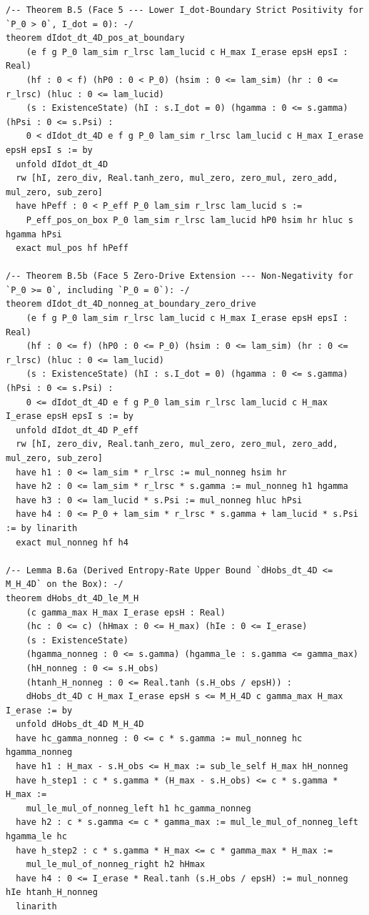 \documentclass[11pt,a4paper]{article}
\theoremstyle{definition}
\begin{document}
\begin{lstlisting}[language=Lean4]
/-- Theorem B.5 (Face 5 --- Lower I_dot-Boundary Strict Positivity for `P_0 > 0`, I_dot = 0): -/
theorem dIdot_dt_4D_pos_at_boundary
    (e f g P_0 lam_sim r_lrsc lam_lucid c H_max I_erase epsH epsI : Real)
    (hf : 0 < f) (hP0 : 0 < P_0) (hsim : 0 <= lam_sim) (hr : 0 <= r_lrsc) (hluc : 0 <= lam_lucid)
    (s : ExistenceState) (hI : s.I_dot = 0) (hgamma : 0 <= s.gamma) (hPsi : 0 <= s.Psi) :
    0 < dIdot_dt_4D e f g P_0 lam_sim r_lrsc lam_lucid c H_max I_erase epsH epsI s := by
  unfold dIdot_dt_4D
  rw [hI, zero_div, Real.tanh_zero, mul_zero, zero_mul, zero_add, mul_zero, sub_zero]
  have hPeff : 0 < P_eff P_0 lam_sim r_lrsc lam_lucid s :=
    P_eff_pos_on_box P_0 lam_sim r_lrsc lam_lucid hP0 hsim hr hluc s hgamma hPsi
  exact mul_pos hf hPeff

/-- Theorem B.5b (Face 5 Zero-Drive Extension --- Non-Negativity for `P_0 >= 0`, including `P_0 = 0`): -/
theorem dIdot_dt_4D_nonneg_at_boundary_zero_drive
    (e f g P_0 lam_sim r_lrsc lam_lucid c H_max I_erase epsH epsI : Real)
    (hf : 0 <= f) (hP0 : 0 <= P_0) (hsim : 0 <= lam_sim) (hr : 0 <= r_lrsc) (hluc : 0 <= lam_lucid)
    (s : ExistenceState) (hI : s.I_dot = 0) (hgamma : 0 <= s.gamma) (hPsi : 0 <= s.Psi) :
    0 <= dIdot_dt_4D e f g P_0 lam_sim r_lrsc lam_lucid c H_max I_erase epsH epsI s := by
  unfold dIdot_dt_4D P_eff
  rw [hI, zero_div, Real.tanh_zero, mul_zero, zero_mul, zero_add, mul_zero, sub_zero]
  have h1 : 0 <= lam_sim * r_lrsc := mul_nonneg hsim hr
  have h2 : 0 <= lam_sim * r_lrsc * s.gamma := mul_nonneg h1 hgamma
  have h3 : 0 <= lam_lucid * s.Psi := mul_nonneg hluc hPsi
  have h4 : 0 <= P_0 + lam_sim * r_lrsc * s.gamma + lam_lucid * s.Psi := by linarith
  exact mul_nonneg hf h4

/-- Lemma B.6a (Derived Entropy-Rate Upper Bound `dHobs_dt_4D <= M_H_4D` on the Box): -/
theorem dHobs_dt_4D_le_M_H
    (c gamma_max H_max I_erase epsH : Real)
    (hc : 0 <= c) (hHmax : 0 <= H_max) (hIe : 0 <= I_erase)
    (s : ExistenceState)
    (hgamma_nonneg : 0 <= s.gamma) (hgamma_le : s.gamma <= gamma_max)
    (hH_nonneg : 0 <= s.H_obs)
    (htanh_H_nonneg : 0 <= Real.tanh (s.H_obs / epsH)) :
    dHobs_dt_4D c H_max I_erase epsH s <= M_H_4D c gamma_max H_max I_erase := by
  unfold dHobs_dt_4D M_H_4D
  have hc_gamma_nonneg : 0 <= c * s.gamma := mul_nonneg hc hgamma_nonneg
  have h1 : H_max - s.H_obs <= H_max := sub_le_self H_max hH_nonneg
  have h_step1 : c * s.gamma * (H_max - s.H_obs) <= c * s.gamma * H_max :=
    mul_le_mul_of_nonneg_left h1 hc_gamma_nonneg
  have h2 : c * s.gamma <= c * gamma_max := mul_le_mul_of_nonneg_left hgamma_le hc
  have h_step2 : c * s.gamma * H_max <= c * gamma_max * H_max :=
    mul_le_mul_of_nonneg_right h2 hHmax
  have h4 : 0 <= I_erase * Real.tanh (s.H_obs / epsH) := mul_nonneg hIe htanh_H_nonneg
  linarith


\end{lstlisting}
\end{document}

